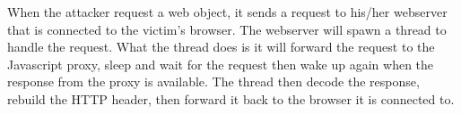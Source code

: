 When the attacker request a web object, it sends a request to his/her webserver that is connected to the victim's browser. The webserver will spawn a thread to handle the request. What the thread does is it will forward the request to the Javascript proxy, sleep and wait for the request then wake up again when the response from the proxy is available. The thread then decode the response, rebuild the HTTP header, then forward it back to the browser it is connected to.
